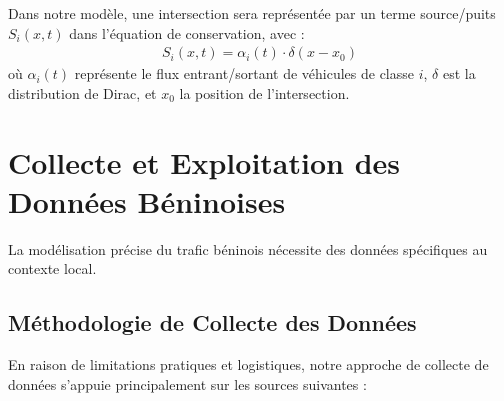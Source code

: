 \begin{theorem}
Dans notre modèle, une intersection sera représentée par un terme source/puits $S_i(x,t)$ dans l'équation de conservation, avec :
\begin{align}
S_i(x,t) = \alpha_i(t) \cdot \delta(x-x_0)
\end{align}
où $\alpha_i(t)$ représente le flux entrant/sortant de véhicules de classe $i$, $\delta$ est la distribution de Dirac, et $x_0$ la position de l'intersection.
\end{theorem}

\section{Collecte et Exploitation des Données Béninoises}
\label{sec:collecte_donnees}

La modélisation précise du trafic béninois nécessite des données spécifiques au contexte local.

\subsection{Méthodologie de Collecte des Données}
\label{subsec:methodologie_collecte}

En raison de limitations pratiques et logistiques, notre approche de collecte de données s'appuie principalement sur les sources suivantes :

